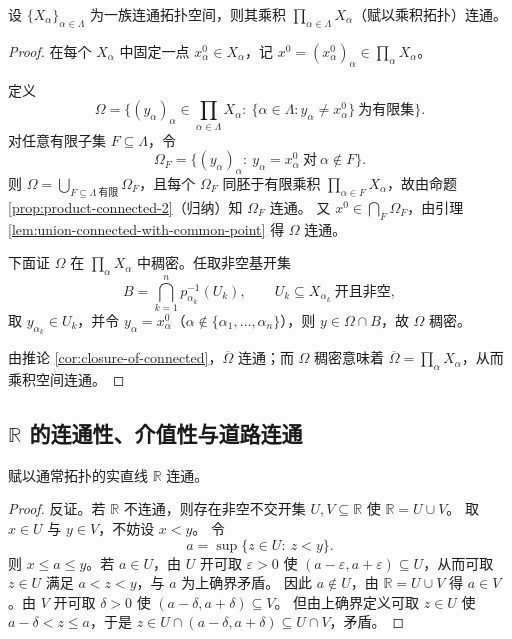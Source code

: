 \documentclass[lang=cn,a4paper,newtx,figureplace=section,tableplace=section]{elegantbook}
\begin{document}
\begin{theorem}\label{thm:arbitrary-product-connected}
  设 $\{X_\alpha\}_{\alpha\in\Lambda}$ 为一族连通拓扑空间，则其乘积 $\prod_{\alpha\in\Lambda}X_\alpha$（赋以乘积拓扑）连通。
\end{theorem}
\begin{proof}
  在每个 $X_\alpha$ 中固定一点 $x_\alpha^0\in X_\alpha$，记 $x^0=(x_\alpha^0)_\alpha\in\prod_\alpha X_\alpha$。

  定义
  \[
    \Omega=\Big\{(y_\alpha)_\alpha\in\prod_{\alpha\in\Lambda}X_\alpha:\ \{\alpha\in\Lambda: y_\alpha\ne x_\alpha^0\}\ \text{为有限集}\Big\}.
  \]
  对任意有限子集 $F\subseteq\Lambda$，令
  \[
    \Omega_F=\{(y_\alpha)_\alpha:\ y_\alpha=x_\alpha^0\ \text{对}\ \alpha\notin F\}.
  \]
  则 $\Omega=\bigcup_{F\subseteq\Lambda\ \text{有限}}\Omega_F$，且每个 $\Omega_F$ 同胚于有限乘积 $\prod_{\alpha\in F}X_\alpha$，故由命题 \ref{prop:product-connected-2}（归纳）知 $\Omega_F$ 连通。
  又 $x^0\in\bigcap_F\Omega_F$，由引理 \ref{lem:union-connected-with-common-point} 得 $\Omega$ 连通。

  下面证 $\Omega$ 在 $\prod_{\alpha}X_\alpha$ 中稠密。任取非空基开集
  \[
    B=\bigcap_{k=1}^{n}p_{\alpha_k}^{-1}(U_k),\qquad U_k\subseteq X_{\alpha_k}\ \text{开且非空},
  \]
  取 $y_{\alpha_k}\in U_k$，并令 $y_\alpha=x_\alpha^0$（$\alpha\notin\{\alpha_1,\dots,\alpha_n\}$），则 $y\in\Omega\cap B$，故 $\Omega$ 稠密。

  由推论 \ref{cor:closure-of-connected}，$\overline{\Omega}$ 连通；而 $\Omega$ 稠密意味着 $\overline{\Omega}=\prod_{\alpha}X_\alpha$，从而乘积空间连通。
\end{proof}

\subsection{$\mathbb R$ 的连通性、介值性与道路连通}

\begin{proposition}\label{prop:R-connected}
  赋以通常拓扑的实直线 $\mathbb R$ 连通。
\end{proposition}
\begin{proof}
  反证。若 $\mathbb R$ 不连通，则存在非空不交开集 $U,V\subseteq\mathbb R$ 使 $\mathbb R=U\cup V$。
  取 $x\in U$ 与 $y\in V$，不妨设 $x<y$。
  令
  \[
    a=\sup\{z\in U:\ z<y\}.
  \]
  则 $x\le a\le y$。若 $a\in U$，由 $U$ 开可取 $\varepsilon>0$ 使 $(a-\varepsilon,a+\varepsilon)\subseteq U$，从而可取 $z\in U$ 满足 $a<z<y$，与 $a$ 为上确界矛盾。
  因此 $a\notin U$，由 $\mathbb R=U\cup V$ 得 $a\in V$。由 $V$ 开可取 $\delta>0$ 使 $(a-\delta,a+\delta)\subseteq V$。
  但由上确界定义可取 $z\in U$ 使 $a-\delta<z\le a$，于是 $z\in U\cap(a-\delta,a+\delta)\subseteq U\cap V$，矛盾。
\end{proof}
\end{document}
